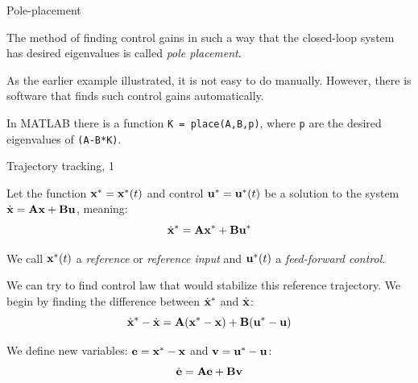 \documentclass{beamer}
\begin{document}
\begin{frame}{Pole-placement}
	\begin{flushleft}
		
		The method of finding control gains in such a way that the closed-loop system has desired eigenvalues is called \emph{pole placement}.
		
		\bigskip
		
		As the earlier example illustrated, it is not easy to do manually. However, there is software that finds such control gains automatically.
		
		\bigskip
		
		In MATLAB there is a function \texttt{K = place(A,B,p)}, where \texttt{p} are the desired eigenvalues of \texttt{(A-B*K)}.
		
		
	\end{flushleft}
\end{frame}










\begin{frame}{Trajectory tracking, 1}
	\begin{flushleft}
		
		Let the function $\mathbf{x}^* = \mathbf{x}^*(t)$ and control $\mathbf{u}^* = \mathbf{u}^*(t)$ be a solution to the system $\dot{\mathbf{x}} = \mathbf{A}\mathbf{x} + \mathbf{B}\mathbf{u}$, meaning:
		\begin{equation}
			\dot{\mathbf{x}}^* = \mathbf{A}\mathbf{x}^* + \mathbf{B}\mathbf{u}^*
		\end{equation}
	
		We call $\mathbf{x}^*(t)$ a \emph{reference} or \emph{reference input} and $\mathbf{u}^*(t)$ a \emph{feed-forward control}.
		
		\bigskip
		
		We can try to find control law that would stabilize this reference trajectory. We begin by finding the difference between $\dot{\mathbf{x}}^*$ and $\dot{\mathbf{x}}$:
		\begin{equation}
			\dot{\mathbf{x}}^* - \dot{\mathbf{x}}= \mathbf{A}(\mathbf{x}^*-\mathbf{x}) + \mathbf{B}(\mathbf{u}^*-\mathbf{u})
		\end{equation}
		
		We define new variables: $\mathbf{e} = \mathbf{x}^* - \mathbf{x}$ and $\mathbf{v} = \mathbf{u}^* - \mathbf{u}$:
		\begin{equation}
			\dot{\mathbf{e}} = \mathbf{A}\mathbf{e} + \mathbf{B}\mathbf{v}
		\end{equation}
		
	\end{flushleft}
\end{frame}
\end{document}
